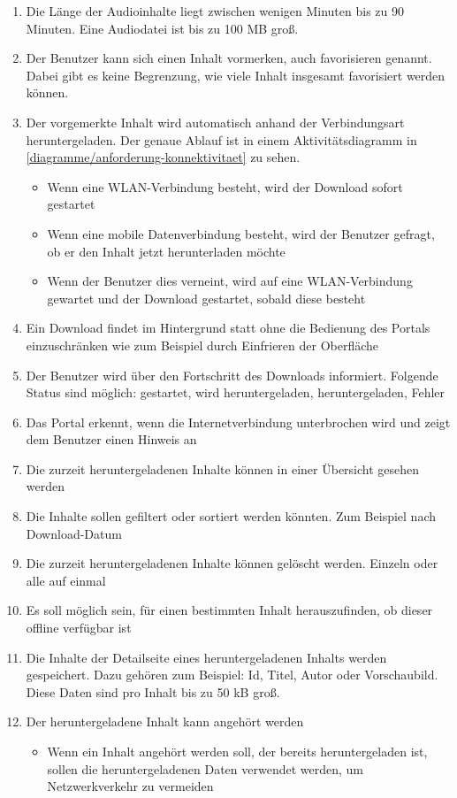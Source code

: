 \begin{enumerate}
    \item Die Länge der Audioinhalte liegt zwischen wenigen Minuten bis zu 90 Minuten. Eine Audiodatei ist bis zu 100 \ac{MB} groß. 
	\item Der Benutzer kann sich einen Inhalt vormerken, auch favorisieren genannt. Dabei gibt es keine Begrenzung, wie viele Inhalt insgesamt favorisiert werden können. 
	\item Der vorgemerkte Inhalt wird automatisch anhand der Verbindungsart heruntergeladen. Der genaue Ablauf ist in einem Aktivitätsdiagramm in \autoref{diagramme/anforderung-konnektivitaet} zu sehen.
	
	\begin{itemize}
		\item Wenn eine WLAN-Verbindung besteht, wird der Download sofort gestartet
		\item Wenn eine mobile Datenverbindung besteht, wird der Benutzer gefragt, ob er den Inhalt jetzt herunterladen möchte
		\item Wenn der Benutzer dies verneint, wird auf eine WLAN-Verbindung gewartet und der Download gestartet, sobald diese besteht
	\end{itemize}
	

	\item Ein Download findet im Hintergrund statt ohne die Bedienung des Portals einzuschränken wie zum Beispiel durch Einfrieren der Oberfläche
	\item Der Benutzer wird über den Fortschritt des Downloads informiert. Folgende Status sind möglich: gestartet, wird heruntergeladen, heruntergeladen, Fehler
	\item Das Portal erkennt, wenn die Internetverbindung unterbrochen wird und zeigt dem Benutzer einen Hinweis an
	\item Die zurzeit heruntergeladenen Inhalte können in einer Übersicht gesehen werden
	\item Die Inhalte sollen gefiltert oder sortiert werden könnten. Zum Beispiel nach Download-Datum
 	\item Die zurzeit heruntergeladenen Inhalte können gelöscht werden. Einzeln oder alle auf einmal
	\item Es soll möglich sein, für einen bestimmten Inhalt herauszufinden, ob dieser offline verfügbar ist
	\item Die Inhalte der Detailseite eines heruntergeladenen Inhalts werden gespeichert. Dazu gehören zum Beispiel: Id, Titel, Autor oder Vorschaubild. Diese Daten sind pro Inhalt bis zu 50 \ac{kB} groß.
	\item Der heruntergeladene Inhalt kann angehört werden
	\begin{itemize}
		\item Wenn ein Inhalt angehört werden soll, der bereits heruntergeladen ist, sollen die heruntergeladenen Daten verwendet werden, um Netzwerkverkehr zu vermeiden
	\end{itemize}
	
\end{enumerate}

